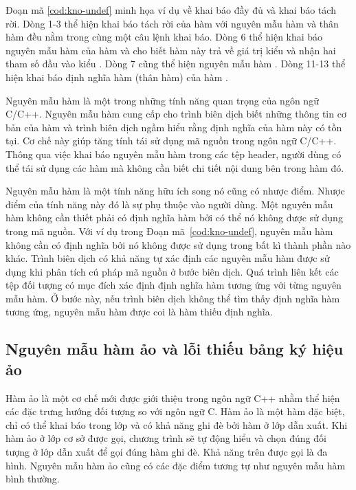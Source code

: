 Đoạn mã \ref{cod:kno-undef} minh họa ví dụ về khai báo đầy đủ và khai báo tách rời. Dòng 1-3 thể hiện khai báo tách rời của hàm  với nguyên mẫu hàm và thân hàm đều nằm trong cùng một câu lệnh khai báo. Dòng 6 thể hiện khai báo nguyên mẫu hàm của hàm  và cho biết hàm này trả về giá trị kiểu  và nhận hai tham số đầu vào kiểu . Dòng 7 cũng thể hiện nguyên mẫu hàm . Dòng 11-13 thể hiện khai báo định nghĩa hàm (thân hàm) của hàm .

Nguyên mẫu hàm là một trong những tính năng quan trọng của ngôn ngữ C/C++. Nguyên mẫu hàm cung cấp cho trình biên dịch biết những thông tin cơ bản của hàm và trình biên dịch ngầm hiểu rằng định nghĩa của hàm này có tồn tại. Cơ chế này giúp tăng tính tái sử dụng mã nguồn trong ngôn ngữ C/C++. Thông qua việc khai báo nguyên mẫu hàm trong các tệp header, người dùng có thể tái sử dụng các hàm mà không cần biết chi tiết nội dung bên trong hàm đó.

Nguyên mẫu hàm là một tính năng hữu ích song nó cũng có nhược điểm. Nhược điểm của tính năng này đó là sự phụ thuộc vào người dùng. Một nguyên mẫu hàm không cần thiết phải có định nghĩa hàm bởi có thể nó không được sử dụng trong mã nguồn. Với ví dụ trong Đoạn mã~\ref{cod:kno-undef}, nguyên mẫu hàm  không cần có định nghĩa bởi nó không được sử dụng trong bất kì thành phần nào khác. Trình biên dịch có khả năng tự xác định các nguyên mẫu hàm được sử dụng khi phân tích cú pháp mã nguồn ở bước biên dịch. Quá trình liên kết các tệp đối tượng có mục đích xác định định nghĩa hàm tương ứng với từng nguyên mẫu hàm. Ở bước này, nếu trình biên dịch không thể tìm thấy định nghĩa hàm tương ứng, nguyên mẫu hàm được coi là hàm thiếu định nghĩa.
\subsection{Nguyên mẫu hàm ảo và lỗi thiếu bảng ký hiệu ảo}
Hàm ảo là một cơ chế mới được giới thiệu trong ngôn ngữ C++ nhằm thể hiện các đặc trưng hướng đối tượng so với ngôn ngữ C. Hàm ảo là một hàm đặc biệt, chỉ có thể khai báo trong lớp và có khả năng ghi đè bởi hàm ở lớp dẫn xuất. Khi hàm ảo ở lớp cơ sở được gọi, chương trình sẽ tự động hiểu và chọn đúng đối tượng ở lớp dẫn xuất để gọi đúng hàm ghi đè. Khả năng trên được gọi là đa hình. Nguyên mẫu hàm ảo cũng có các đặc điểm tương tự như nguyên mẫu hàm bình thường.

